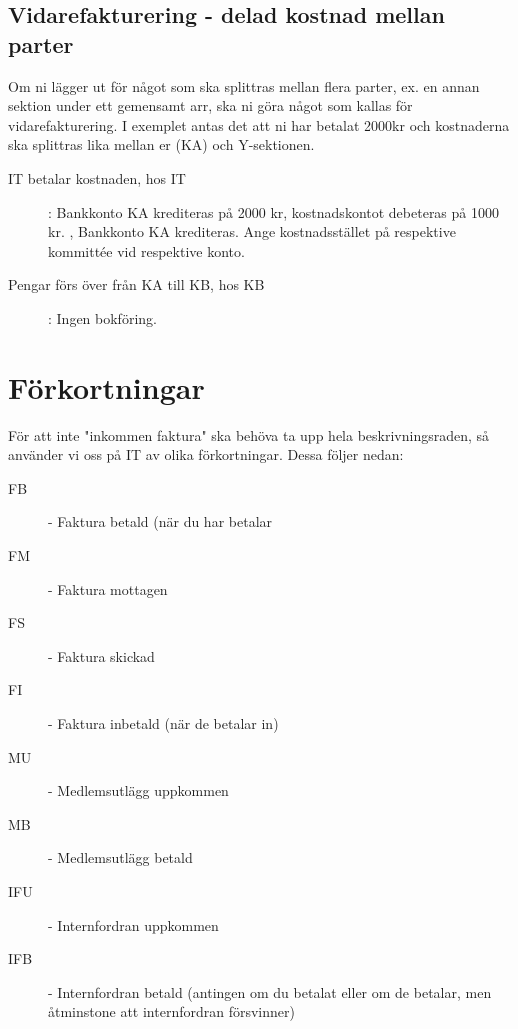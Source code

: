 \documentclass{article}
\begin{document}
\subsection{Vidarefakturering - delad kostnad mellan parter}
Om ni lägger ut för något som ska splittras mellan flera parter, ex. en annan sektion under ett gemensamt arr, ska ni göra något som kallas för vidarefakturering. I exemplet antas det att ni har betalat 2000kr och kostnaderna ska splittras lika mellan er (KA) och Y-sektionen. 
\begin{description}
    \item [IT betalar kostnaden, hos IT]: Bankkonto KA krediteras på 2000 kr, kostnadskontot debeteras på 1000 kr. , Bankkonto KA krediteras. Ange kostnadsstället på respektive kommittée vid respektive konto.
    \item [Pengar förs över från KA till KB, hos KB]: Ingen bokföring. 
\end{description}

\section{Förkortningar}
För att inte "inkommen faktura" ska behöva ta upp hela beskrivningsraden, så använder vi oss på IT av olika förkortningar. Dessa följer nedan: 
\begin{description}
    \item[FB] - Faktura betald (när du har betalar 
    \item[FM] - Faktura mottagen
    \item[FS] - Faktura skickad
    \item[FI] - Faktura inbetald (när de betalar in)
    \item[MU] - Medlemsutlägg uppkommen
    \item[MB] - Medlemsutlägg betald
    \item[IFU] - Internfordran uppkommen
    \item[IFB] - Internfordran betald (antingen om du betalat eller om de betalar, men åtminstone att internfordran försvinner)

\end{description}
\end{document}
